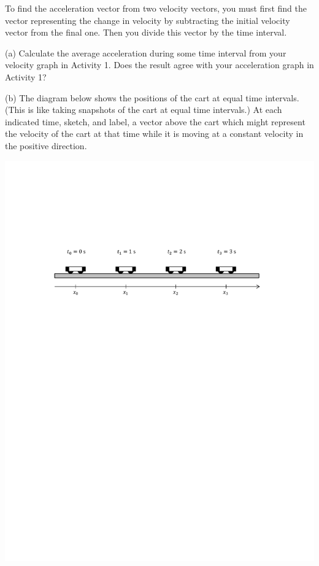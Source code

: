 To find the acceleration vector from two velocity vectors, you must first find
the vector representing the change in velocity by subtracting the initial velocity
vector from the final one. Then you divide this vector by the time interval. 

(a) Calculate the average acceleration during some time interval from your velocity graph in Activity 1.  Does the result agree with your acceleration graph in Activity 1?
\answerspace{20mm}

(b) The diagram below shows the positions of the cart at equal time intervals.
(This is like taking snapshots of the cart at equal time intervals.) At each
indicated time, sketch, and label, a vector above the cart which might represent the velocity
of the cart at that time while it is moving at a constant velocity in the positive direction.

{\par\centering \includegraphics{changing/carts_const_v.pdf} \par}

